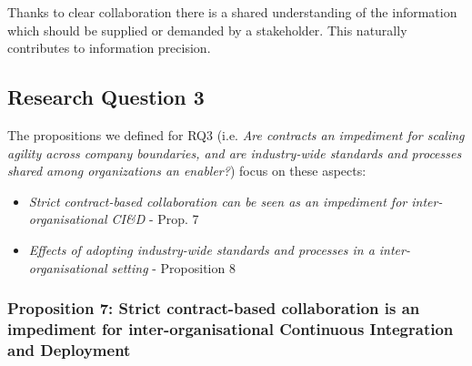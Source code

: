 Thanks to clear collaboration there is a shared understanding of the information which should be supplied or demanded by a stakeholder. This naturally contributes to information precision.

\subsection{Research Question 3}\label{sec:ResearchQuestion3}

The propositions we defined for  
RQ3 (i.e. {\em Are contracts an impediment for scaling agility across company boundaries, and 
are industry-wide standards and processes shared among organizations an enabler?}) focus on these aspects:

\begin{itemize}
\item {\em Strict contract-based collaboration can be seen as an impediment for inter-organisational CI\&D}  - Prop. 7 
\item {\em Effects of adopting industry-wide standards and processes in a inter-organisational setting} - Proposition 8 
\end{itemize}

\vspace{.2cm}
\subsubsection{Proposition 7: Strict contract-based collaboration is an impediment for inter-organisational Continuous Integration and Deployment}


